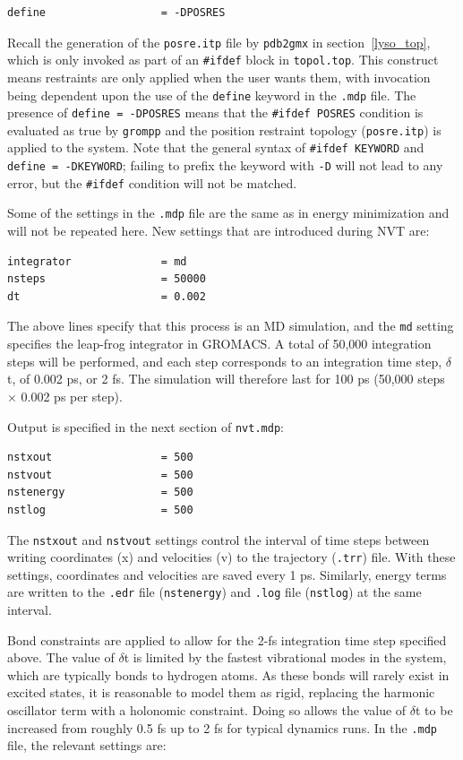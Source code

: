 \documentclass[9pt,tutorial,pubversion]{livecoms}
\begin{document}
\begin{lstlisting}
define                  = -DPOSRES
\end{lstlisting}
%
Recall the generation of the \texttt{posre.itp} file by \texttt{pdb2gmx} in section~\ref{lyso_top}, which is only invoked as part of an \texttt{\#ifdef} block in \texttt{topol.top}. This construct means restraints are only applied when the user wants them, with invocation being dependent upon the use of the \texttt{define} keyword in the \texttt{.mdp} file. The presence of \texttt{define = -DPOSRES} means that the \texttt{\#ifdef POSRES} condition is evaluated as true by \texttt{grompp} and the position restraint topology (\texttt{posre.itp}) is applied to the system. Note that the general syntax of \texttt{\#ifdef KEYWORD} and \texttt{define = -DKEYWORD}; failing to prefix the keyword with \texttt{-D} will not lead to any error, but the \texttt{\#ifdef} condition will not be matched.

Some of the settings in the \texttt{.mdp} file are the same as in energy minimization and will not be repeated here. New settings that are introduced during NVT are:

\begin{lstlisting}
integrator              = md
nsteps                  = 50000
dt                      = 0.002
\end{lstlisting}
%
The above lines specify that this process is an MD simulation, and the \texttt{md} setting specifies the leap-frog integrator in GROMACS. A total of 50,000 integration steps will be performed, and each step corresponds to an integration time step, $\delta$t, of 0.002 ps, or 2 fs. The simulation will therefore last for 100 ps (50,000 steps $\times$ 0.002 ps per step).

Output is specified in the next section of \texttt{nvt.mdp}:

\begin{lstlisting}
nstxout                 = 500
nstvout                 = 500
nstenergy               = 500
nstlog                  = 500
\end{lstlisting}
%
The \texttt{nstxout} and \texttt{nstvout} settings control the interval of time steps between writing coordinates (x) and velocities (v) to the trajectory (\texttt{.trr}) file. With these settings, coordinates and velocities are saved every 1 ps. Similarly, energy terms are written to the \texttt{.edr} file (\texttt{nstenergy}) and \texttt{.log} file (\texttt{nstlog}) at the same interval.

Bond constraints are applied to allow for the 2-fs integration time step specified above. The value of $\delta$t is limited by the fastest vibrational modes in the system, which are typically bonds to hydrogen atoms. As these bonds will rarely exist in excited states, it is reasonable to model them as rigid, replacing the harmonic oscillator term with a holonomic constraint. Doing so allows the value of $\delta$t to be increased from roughly 0.5 fs up to 2 fs for typical dynamics runs. In the \texttt{.mdp} file, the relevant settings are:
\end{document}
